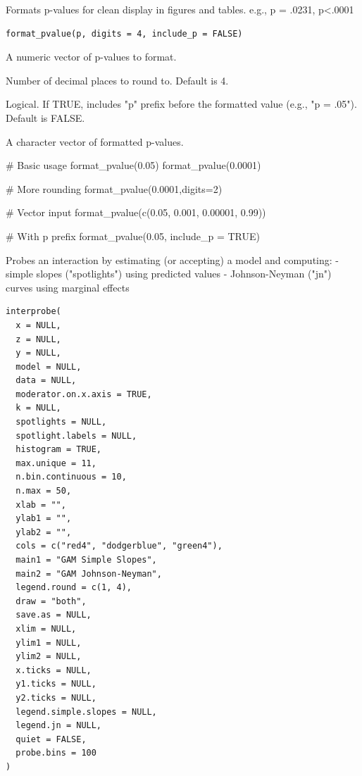 \documentclass[a4paper]{book}
\begin{document}
%
\begin{Description}
Formats p-values for clean display in figures and tables. e.g., p = .0231, p<.0001
\end{Description}
%
\begin{Usage}
\begin{verbatim}
format_pvalue(p, digits = 4, include_p = FALSE)
\end{verbatim}
\end{Usage}
%
\begin{Arguments}
\begin{ldescription}
\item[\code{p}] A numeric vector of p-values to format.

\item[\code{digits}] Number of decimal places to round to. Default is 4.

\item[\code{include\_p}] Logical. If TRUE, includes "p" prefix before the formatted
value (e.g., "p = .05"). Default is FALSE.
\end{ldescription}
\end{Arguments}
%
\begin{Value}
A character vector of formatted p-values.
\end{Value}
%
\begin{Examples}
\begin{ExampleCode}
# Basic usage
format_pvalue(0.05)
format_pvalue(0.0001)

# More rounding
format_pvalue(0.0001,digits=2)

# Vector input
format_pvalue(c(0.05, 0.001, 0.00001, 0.99))

# With p prefix
format_pvalue(0.05, include_p = TRUE)

\end{ExampleCode}
\end{Examples}
%
\begin{Description}
Probes an interaction by estimating (or accepting) a model and computing:
- simple slopes ("spotlights") using predicted values
- Johnson-Neyman ("jn") curves using marginal effects
\end{Description}
%
\begin{Usage}
\begin{verbatim}
interprobe(
  x = NULL,
  z = NULL,
  y = NULL,
  model = NULL,
  data = NULL,
  moderator.on.x.axis = TRUE,
  k = NULL,
  spotlights = NULL,
  spotlight.labels = NULL,
  histogram = TRUE,
  max.unique = 11,
  n.bin.continuous = 10,
  n.max = 50,
  xlab = "",
  ylab1 = "",
  ylab2 = "",
  cols = c("red4", "dodgerblue", "green4"),
  main1 = "GAM Simple Slopes",
  main2 = "GAM Johnson-Neyman",
  legend.round = c(1, 4),
  draw = "both",
  save.as = NULL,
  xlim = NULL,
  ylim1 = NULL,
  ylim2 = NULL,
  x.ticks = NULL,
  y1.ticks = NULL,
  y2.ticks = NULL,
  legend.simple.slopes = NULL,
  legend.jn = NULL,
  quiet = FALSE,
  probe.bins = 100
)
\end{verbatim}
\end{Usage}
\end{document}
